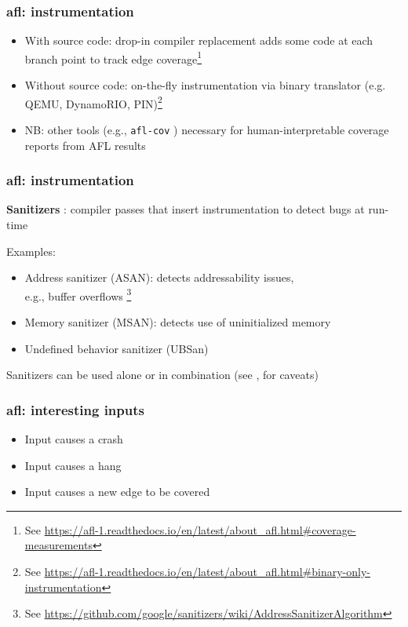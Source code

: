 \documentclass{beamer}
\begin{document}
\begin{frame}
	\frametitle{afl: instrumentation}
	
	\begin{itemize}
		\item{With source code: drop-in compiler replacement adds some code at each branch point to track edge coverage\footnote{See \url{https://afl-1.readthedocs.io/en/latest/about\_afl.html\#coverage-measurements}}}

		\item{Without source code: on-the-fly instrumentation via binary translator (e.g. QEMU, DynamoRIO, PIN)\footnote{See \url{https://afl-1.readthedocs.io/en/latest/about\_afl.html\#binary-only-instrumentation}}} 
		
		\item{NB: other tools (e.g., \texttt{afl-cov} \cite{aflcov}) necessary for human-interpretable coverage reports from AFL results}
	\end{itemize}
\end{frame}

\begin{frame}
	\frametitle{afl: instrumentation}
	\textbf{Sanitizers} \cite{sanitizers}: compiler passes that insert instrumentation to detect bugs at run-time
	
	\vspace{\baselineskip}
	Examples: \begin{itemize}
		\item{Address sanitizer (ASAN): detects addressability issues, \\e.g., buffer overflows \footnote{See \url{https://github.com/google/sanitizers/wiki/AddressSanitizerAlgorithm}}}
		\item{Memory sanitizer (MSAN): detects use of uninitialized memory}
		\item{Undefined behavior sanitizer (UBSan)}
	\end{itemize}

	\vspace{\baselineskip}
	Sanitizers can be used alone or in combination (see \cite{afl_asannotes}, \cite{githubseclab} for caveats)
\end{frame}


\begin{frame}
	\frametitle{afl: interesting inputs}
	\begin{itemize}
		\item{Input causes a crash}
		\item{Input causes a hang}
		\item{Input causes a new edge to be covered}
	\end{itemize}

\end{frame}
\end{document}
